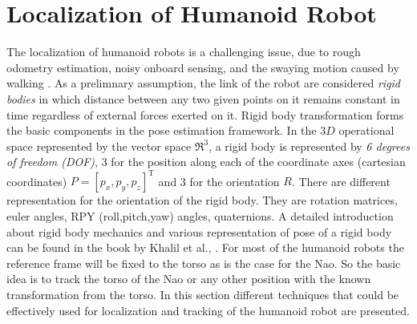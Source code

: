 \section{Localization of Humanoid Robot} %
The localization of humanoid robots is a challenging issue, due to rough odometry estimation, noisy onboard sensing, and the swaying motion caused by walking \cite{cervera2012localization}. As a prelimnary assumption, the link of the robot are considered \emph{rigid bodies} in which distance between any two given points on it remains constant in time regardless of external forces exerted on it. Rigid body transformation forms the basic components in the pose estimation framework. In the $3D$ operational space represented by the vector space $\Re^3$, a rigid body is represented by \emph{6 degrees of freedom (DOF)}, 3 for the position along each of the coordinate axes (cartesian coordinates) $P = [p_x,p_y,p_z]^{\text{T}}$ and 3 for the orientation $R$. There are different representation for the orientation of the rigid body. They are rotation matrices, euler angles, RPY (roll,pitch,yaw) angles, quaternions. A detailed introduction about rigid body mechanics and various representation of pose of a rigid body can be found in the book by Khalil et al., \cite{khalil2004modeling}. For most of the humanoid robots the reference frame will be fixed to the torso as is the case for the Nao. So the basic idea is to track the torso of the Nao or any other position with the known transformation from the torso. In this section different techniques that could be effectively used for localization and tracking of the humanoid robot are presented.

